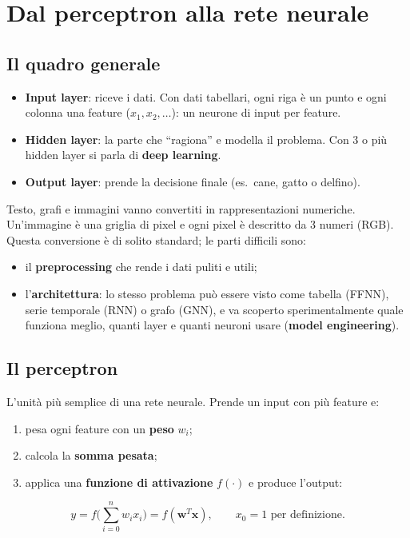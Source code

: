 \chapter{Dal perceptron alla rete neurale}
\label{cap:reti-neurali}

\section{Il quadro generale}
\begin{itemize}
  \item \textbf{Input layer}: riceve i dati. Con dati tabellari, ogni riga è un punto e ogni colonna una feature
        ($x_1, x_2, \ldots$): un neurone di input per feature.
  \item \textbf{Hidden layer}: la parte che ``ragiona'' e modella il problema. Con 3 o più hidden layer si parla di
        \textbf{deep learning}.
  \item \textbf{Output layer}: prende la decisione finale (es.\ cane, gatto o delfino).
\end{itemize}

\begin{attenzione}
Testo, grafi e immagini vanno convertiti in rappresentazioni numeriche. Un'immagine è una griglia di pixel e
ogni pixel è descritto da 3 numeri (RGB). Questa conversione è di solito standard; le parti difficili sono:
\begin{itemize}
  \item il \textbf{preprocessing} che rende i dati puliti e utili;
  \item l'\textbf{architettura}: lo stesso problema può essere visto come tabella (FFNN), serie temporale (RNN) o grafo (GNN),
        e va scoperto sperimentalmente quale funziona meglio, quanti layer e quanti neuroni usare
        (\textbf{model engineering}).
\end{itemize}
\end{attenzione}

\section{Il perceptron}
\begin{definizione}[perceptron]
L'unità più semplice di una rete neurale. Prende un input con più feature e:
\begin{enumerate}
  \item pesa ogni feature con un \textbf{peso} $w_i$;
  \item calcola la \textbf{somma pesata};
  \item applica una \textbf{funzione di attivazione} $f(\cdot)$ e produce l'output:
\end{enumerate}
\[
y = f\Big(\sum_{i=0}^{n} w_i x_i\Big) = f(\mathbf{w}^T \mathbf{x}), \qquad x_0 = 1 \text{ per definizione}.
\]
\end{definizione}

